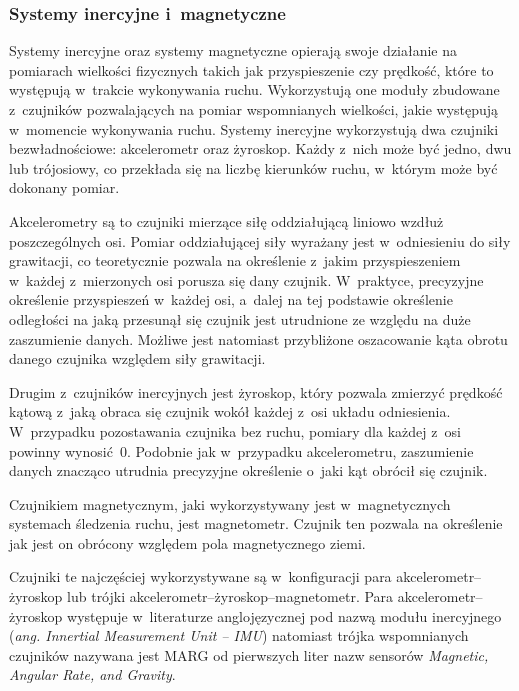 \subsubsection*{Systemy inercyjne i~magnetyczne}\label{chap:mocaps:IMU}
Systemy inercyjne oraz systemy magnetyczne opierają swoje działanie na pomiarach wielkości fizycznych takich jak przyspieszenie czy prędkość, które to występują w~trakcie wykonywania ruchu. Wykorzystują one moduły zbudowane z~czujników pozwalających na pomiar wspomnianych wielkości, jakie występują w~momencie wykonywania ruchu. Systemy inercyjne wykorzystują dwa czujniki bezwładnościowe: akcelerometr oraz żyroskop. Każdy z~nich może być jedno, dwu lub trójosiowy, co przekłada się na liczbę kierunków ruchu, w~którym może być dokonany pomiar.

Akcelerometry są to czujniki mierzące siłę oddziałującą liniowo wzdłuż poszczególnych osi. Pomiar oddziałującej siły wyrażany jest w~odniesieniu do siły grawitacji, co teoretycznie pozwala na określenie z~jakim przyspieszeniem w~każdej z~mierzonych osi porusza się dany czujnik. W~praktyce, precyzyjne określenie przyspieszeń w~każdej osi, a~dalej na tej podstawie określenie odległości na jaką przesunął się czujnik jest utrudnione ze względu na duże zaszumienie danych. Możliwe jest natomiast przybliżone oszacowanie kąta obrotu danego czujnika względem siły grawitacji.

Drugim z~czujników inercyjnych jest żyroskop, który pozwala zmierzyć prędkość kątową z~jaką obraca się czujnik wokół każdej z~osi układu odniesienia. W~przypadku pozostawania czujnika bez ruchu, pomiary dla każdej z~osi powinny wynosić~0. Podobnie jak w~przypadku akcelerometru, zaszumienie danych znacząco utrudnia precyzyjne określenie o~jaki kąt obrócił się czujnik.

Czujnikiem magnetycznym, jaki wykorzystywany jest w~magnetycznych systemach śledzenia ruchu, jest magnetometr. Czujnik ten pozwala na określenie jak jest on obrócony względem pola magnetycznego ziemi.

Czujniki te najczęściej wykorzystywane są w~konfiguracji para akcelerometr--żyroskop lub trójki akcelerometr--żyroskop--magnetometr. Para akcelerometr--żyroskop występuje w~literaturze anglojęzycznej pod nazwą modułu inercyjnego (\emph{ang. Innertial Measurement Unit -- IMU}) natomiast trójka wspomnianych czujników nazywana jest MARG od pierwszych liter nazw sensorów \emph{Magnetic, Angular Rate, and Gravity}.

